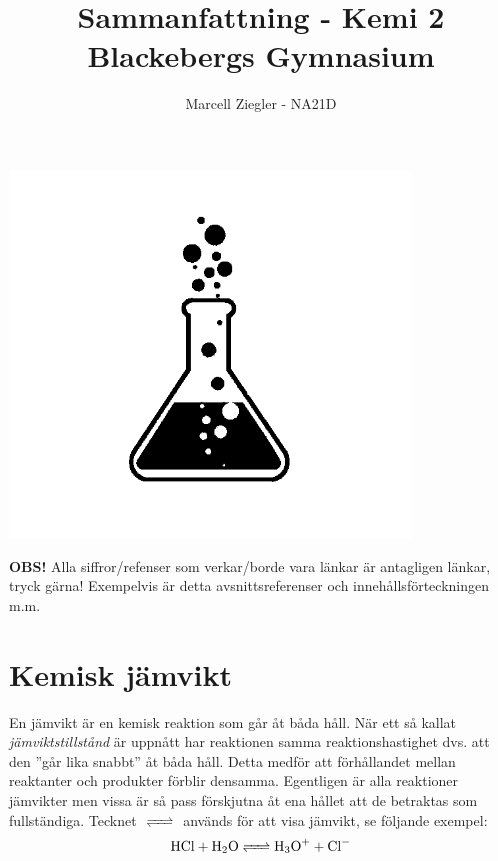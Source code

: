 \documentclass[12pt]{article}
\title{Sammanfattning - Kemi 2 \\ Blackebergs Gymnasium}
\author{Marcell Ziegler - NA21D}
\theoremstyle{definition}
\begin{document}
    \begin{titlepage}
        \maketitle
        \vfill
        \begin{center}
            \includegraphics[width=0.8\textwidth]{title.png}
        \end{center}
        \vfill
        \begin{center}
            \textbf{OBS!} Alla siffror/refenser som verkar/borde vara länkar är antagligen länkar, tryck gärna! Exempelvis är detta avsnittsreferenser och innehållsförteckningen m.m.
        \end{center}
    \end{titlepage}

    \tableofcontents

    \newpage
    \flushbottom
    
    \part{Kemisk jämvikt}
    En jämvikt är en kemisk reaktion som går åt båda håll. När ett så kallat \emph{jämviktstillstånd} är uppnått har reaktionen samma reaktionshastighet dvs. att den ''går lika snabbt'' åt båda håll. Detta medför att förhållandet mellan reaktanter och produkter förblir densamma. Egentligen är alla reaktioner jämvikter men vissa är så pass förskjutna åt ena hållet att de betraktas som fullständiga. Tecknet $\ce{<=>}$ används för att visa jämvikt, se följande exempel:
    \begin{equation*}
        \ce{HCl + H2O <=> H3O+ + Cl-}
    \end{equation*}
\end{document}
